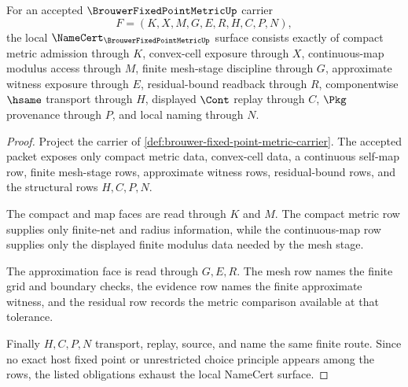 \begin{theorem}
\label{thm:brouwer-fixed-point-metric-namecert-obligations}
For an accepted $\BrouwerFixedPointMetricUp$ carrier
$$
F=(K,X,M,G,E,R,H,C,P,N),
$$
the local $\NameCert_{\BrouwerFixedPointMetricUp}$ surface consists exactly of compact metric admission through $K$, convex-cell exposure through $X$, continuous-map modulus access through $M$, finite mesh-stage discipline through $G$, approximate witness exposure through $E$, residual-bound readback through $R$, componentwise $\hsame$ transport through $H$, displayed $\Cont$ replay through $C$, $\Pkg$ provenance through $P$, and local naming through $N$.
\end{theorem}
\begin{proof}
Project the carrier of \autoref{def:brouwer-fixed-point-metric-carrier}. The accepted packet exposes only compact metric data, convex-cell data, a continuous self-map row, finite mesh-stage rows, approximate witness rows, residual-bound rows, and the structural rows $H,C,P,N$.

The compact and map faces are read through $K$ and $M$. The compact metric row supplies only finite-net and radius information, while the continuous-map row supplies only the displayed finite modulus data needed by the mesh stage.

The approximation face is read through $G,E,R$. The mesh row names the finite grid and boundary checks, the evidence row names the finite approximate witness, and the residual row records the metric comparison available at that tolerance.

Finally $H,C,P,N$ transport, replay, source, and name the same finite route. Since no exact host fixed point or unrestricted choice principle appears among the rows, the listed obligations exhaust the local NameCert surface.
\end{proof}

